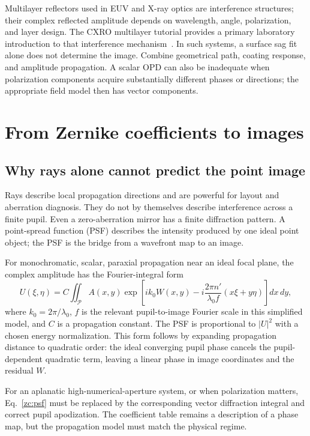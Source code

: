 Multilayer reflectors used in EUV and X-ray optics are interference
structures; their complex reflected amplitude depends on wavelength,
angle, polarization, and layer design. The CXRO multilayer tutorial
provides a primary laboratory introduction to that interference
mechanism~\cite{zc:cxro}. In such systems, a surface sag fit alone does
not determine the image. Combine geometrical path, coating response,
and amplitude propagation. A scalar OPD can also be inadequate when
polarization components acquire substantially different phases or
directions; the appropriate field model then has vector components.

\chapter{From Zernike coefficients to images}
\label{zc:images}

\section{Why rays alone cannot predict the point image}
Rays describe local propagation directions and are powerful for
layout and aberration diagnosis. They do not by themselves describe
interference across a finite pupil. Even a zero-aberration mirror has
a finite diffraction pattern. A point-spread function (PSF) describes
the intensity produced by one ideal point object; the PSF is the bridge
from a wavefront map to an image.

For monochromatic, scalar, paraxial propagation near an ideal focal
plane, the complex amplitude has the Fourier-integral form
\begin{equation}
 U(\xi,\eta)=C\iint_{\mathcal P}A(x,y)
      \exp\left[i k_0W(x,y)
       -i\frac{2\pi n'}{\lambda_0 f}(x\xi+y\eta)\right]dx\,dy,
 \label{zc:psf}
\end{equation}
where $k_0=2\pi/\lambda_0$, $f$ is the relevant pupil-to-image
Fourier scale in this simplified model, and $C$ is a propagation
constant. The PSF is proportional to $|U|^2$ with a chosen energy
normalization. This form follows by expanding propagation distance
to quadratic order: the ideal converging pupil phase cancels the
pupil-dependent quadratic term, leaving a linear phase in image
coordinates and the residual $W$.

For an aplanatic high-numerical-aperture system, or when polarization
matters, Eq.~\eqref{zc:psf} must be replaced by the corresponding
vector diffraction integral and correct pupil apodization. The
coefficient table remains a description of a phase map, but the
propagation model must match the physical regime.

